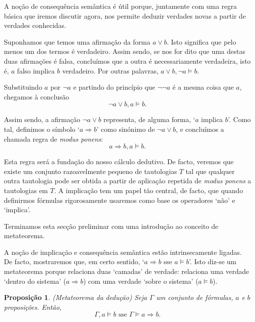 \documentclass{report}
\newtheorem*{prop*}{Proposição}
\theoremstyle{definition}
\theoremstyle{remark}
\newcommand{\imply}{\mathbin{\Rightarrow}}
\begin{document}
	A noção de consequência semântica é útil porque, juntamente com uma regra básica que iremos discutir agora, nos permite deduzir verdades novas a partir de verdades conhecidas.
	
	Suponhamos que temos uma afirmação da forma $a \lor b$. Isto significa que pelo menos um dos termos é verdadeiro. Assim sendo, se nos for dito que uma destas duas afirmações é falsa, concluímos que a outra é necessariamente verdadeira, isto é, $a$ falso implica $b$ verdadeiro. Por outras palavras, $a \lor b, \neg a \vDash b$.
	
	Substituindo $a$ por $\neg a$ e partindo do princípio que $\neg \neg a$ é a mesma coisa que $a$, chegamos à conclusão
	\[\neg a \lor b, a \vDash b.\]
	
	Assim sendo, a afirmação $\neg a \lor b$ representa, de alguma forma, `$a$ implica $b$'. Como tal, definimos o símbolo `$a \imply b$' como sinónimo de $\neg a \lor b$, e concluímos a chamada regra de \textit{modus ponens}:
	\[a \imply b, a \vDash b.\]
	
	Esta regra será a fundação do nosso cálculo dedutivo. De facto, veremos que existe um conjunto razoavelmente pequeno de tautologias $T$ tal que qualquer outra tautologia pode ser obtida a partir de aplicação repetida de \textit{modus ponens} a tautologias em $T$. A implicação tem um papel tão central, de facto, que quando definirmos fórmulas rigorosamente usaremos como base os operadores `não' e `implica'.
	
	\smallskip
	
	Terminamos esta secção preliminar com uma introdução ao conceito de metateorema.
	
	A noção de implicação e consequência semântica estão intrinsecamente ligadas. De facto, mostraremos que, em certo sentido, `$a \imply b$ sse $a \vDash b$'. Isto diz-se um metateorema porque relaciona duas `camadas' de verdade: relaciona uma verdade `dentro do sistema' ($a \imply b$) com uma verdade `sobre o sistema' ($a \vDash b$).
	
	\begin{prop*}
	(Metateorema da dedução) Seja $\Gamma$ um conjunto de fórmulas, $a$ e $b$ proposições. Então,
	\[\Gamma, a \vDash b \text{ sse } \Gamma \vDash a \imply b.\]
	\end{prop*}
	
\end{document}
